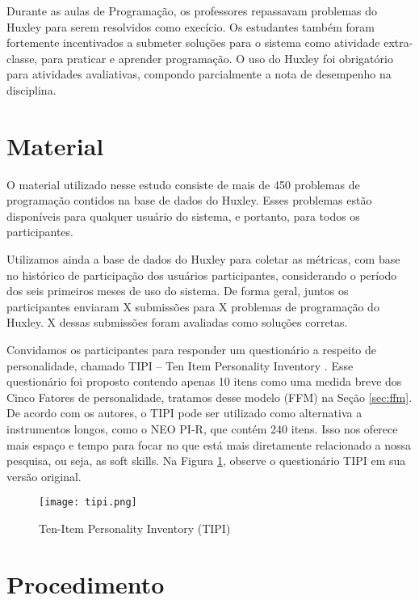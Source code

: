 Durante as aulas de Programação, os professores repassavam problemas do Huxley para serem resolvidos como execício. Os estudantes também foram fortemente incentivados a submeter soluções para o sistema como atividade extra-classe, para praticar e aprender programação. O uso do Huxley foi obrigatório para atividades avaliativas, compondo parcialmente a nota de desempenho na disciplina.

\section{Material}
\label{sec:material}

O material utilizado nesse estudo consiste de mais de 450 problemas de programação contidos na base de dados do Huxley. Esses problemas estão disponíveis para qualquer usuário do sistema, e portanto, para todos os participantes.

Utilizamos ainda a base de dados do Huxley para coletar as métricas, com base no histórico de participação dos usuários participantes, considerando o período dos seis primeiros meses de uso do sistema. De forma geral, juntos os participantes enviaram X submissões para X problemas de programação do Huxley. X dessas submissões foram avaliadas como soluções corretas.

Convidamos os participantes para responder um questionário a respeito de personalidade, chamado TIPI – Ten Item Personality Inventory \cite{gosling:03}. Esse questionário foi proposto contendo apenas 10 itens como uma medida breve dos Cinco Fatores de personalidade, tratamos desse modelo (FFM) na Seção \ref{sec:ffm}. De acordo com os autores, o TIPI pode ser utilizado como alternativa a instrumentos longos, como o NEO PI-R, que contém 240 itens. Isso nos oferece mais espaço e tempo para focar no que está mais diretamente relacionado a nossa pesquisa, ou seja, as soft skills. Na Figura \ref{fig:tipi}, observe o questionário TIPI em sua versão original.

\begin{figure}[h*]
\centering
\caption{\small Ten-Item Personality Inventory (TIPI)}
\texttt{[image: tipi.png]}
\label{fig:tipi}
\end{figure}

\section{Procedimento}
\label{sec:procedimento}

